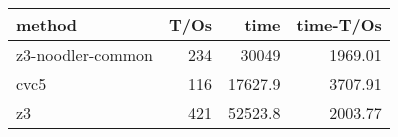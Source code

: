 \begin{tabular}{lrrr}
\hline
 method            &   T/Os &    time &   time-T/Os \\
\hline
 z3-noodler-common &    234 & 30049   &     1969.01 \\
 cvc5              &    116 & 17627.9 &     3707.91 \\
 z3                &    421 & 52523.8 &     2003.77 \\
\hline
\end{tabular}
